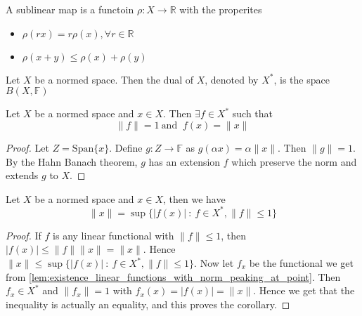 
\chapter{}

\begin{definition}
  A sublinear map is a functoin $\rho: X \to \mathbb{R}$ with the properites \begin{itemize}[]
    \item $\rho(rx) = r \rho(x), \forall r \in \mathbb{R}$
    \item $\rho(x+y) \le \rho(x)+\rho(y)$
  \end{itemize}
\end{definition}

\begin{definition}
  Let $X$ be a normed space. Then the dual of $X$, denoted by $ X^{*}$, is the space $B(X, \mathbb{F})$
\end{definition}

\begin{lemma}
  \label{lem:existence_linear_functions_with_norm_peaking_at_point}
  Let $X$ be a normed space and $x \in X$. Then $\exists f \in X^{*}$ such that \[
    \|f\| = 1 \ \textrm{and } \ f(x) = \|x\|
  \]
\end{lemma}
\begin{proof}
  Let $Z = \textrm{Span}\{ x \}$. Define $g: Z \to \mathbb{F}$ as $g(\alpha  x) = \alpha \|x\|$. Then $\|g\| = 1$. By the Hahn Banach theorem, $g$ has an extension $f$ which preserve the norm and extends $g$ to $X$.
\end{proof}

\begin{corollary}
  \label{cor:dual_maps_norm_elements}
   Let $X$ be a normed space and $x \in X$, then we have \[
     \|x\| = \sup \{ |f(x)| \ : \ f \in X^{*}, \|f\| \le 1 \}
   \]
\end{corollary}
\begin{proof}
  If $f$ is any linear functional with $\|f\| \le 1$, then $|f(x)| \le \|f\|\|x\| = \|x\|$. Hence $\|x\| \le \sup \{ |f(x)| \ : \ f \in X^{*}, \|f\| \le 1 \}$.
  Now let $f_x$ be the functional we get from \autoref{lem:existence_linear_functions_with_norm_peaking_at_point}. Then $f_x \in X^{*}$ and $\|f_x\| = 1$ with $f_x(x) = |f(x)| = \|x\|$. Hence we get that the inequality is actually an equality, and this proves the corollary.
\end{proof}


